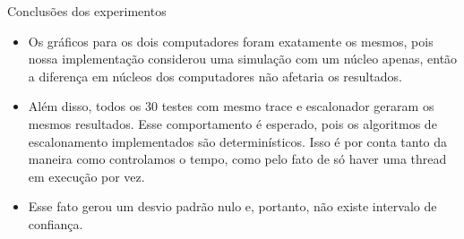 \documentclass[10pt]{beamer}
\begin{document}
    \begin{frame}{Conclusões dos experimentos}
        \begin{itemize}
            \justifying
            \item Os gráficos para os dois computadores foram exatamente os mesmos,
                pois nossa implementação
                considerou uma simulação com um núcleo apenas, então a diferença em
                núcleos dos computadores não afetaria os resultados.
            \item Além disso, todos os 30 testes com mesmo trace e escalonador
                geraram os mesmos resultados. Esse comportamento é esperado,
                pois os algoritmos de escalonamento implementados são
                determinísticos. Isso é por conta tanto da maneira como controlamos
                o tempo, como pelo fato de só haver uma thread em execução por vez.
            \item Esse fato gerou um desvio padrão nulo e, portanto, não existe
                intervalo de confiança.
        \end{itemize}
    \end{frame}
\end{document}
